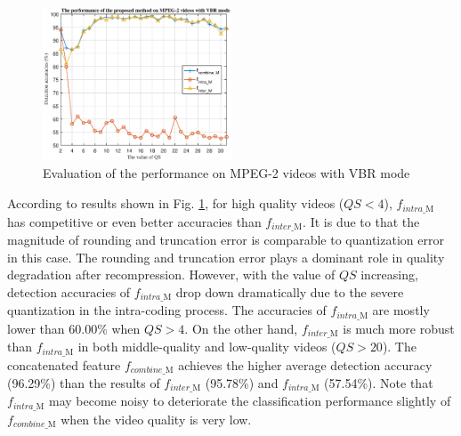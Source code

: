 \documentclass[journal,sort]{IEEEtran}
\begin{document}
\begin{figure}[htbp!]
	\centering
	\includegraphics[width=0.5\textwidth]{MPEG2-VBR.eps}
	\caption{Evaluation of the performance on MPEG-2 videos with VBR mode}
	\label{mpeg2-vbr}
\end{figure}


According to results shown in Fig. \ref{mpeg2-vbr}, for high quality videos ($QS<4$), $f_{intra\_\text{M}}$ has competitive or even better accuracies than $f_{inter\_\text{M}}$. It is due to that the magnitude of rounding and truncation error is comparable to quantization error in this case. The rounding and truncation error plays a dominant role in quality degradation after recompression. However, with the value of $QS$ increasing, detection accuracies of $f_{intra\_\text{M}}$ drop down dramatically due to the severe quantization in the intra-coding process. The accuracies of $f_{intra\_\text{M}}$ are mostly lower than 60.00\% when $QS >4$. On the other hand, $f_{inter\_\text{M}}$ is much more robust than $f_{intra\_\text{M}}$ in both middle-quality and low-quality videos ($QS>20$). The concatenated feature $f_{combine\_\text{M}}$ achieves the higher average detection accuracy (96.29\%) than the results of $f_{inter\_\text{M}}$ (95.78\%) and $f_{intra\_\text{M}}$ (57.54\%). Note that $f_{intra\_\text{M}}$ may become noisy to deteriorate the classification performance slightly of $f_{combine\_\text{M}}$ when the video quality is very low.
\end{document}
